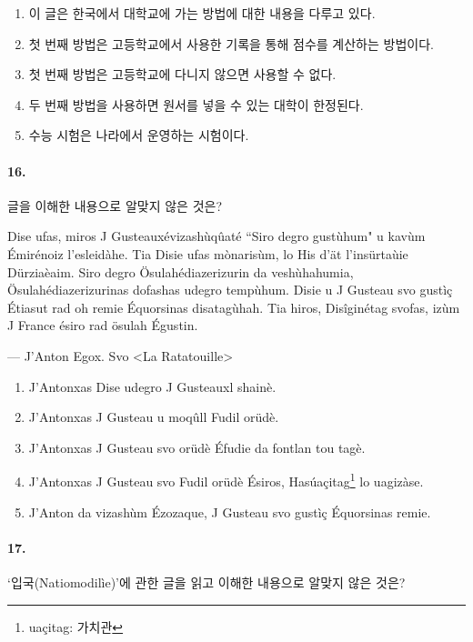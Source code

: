 \documentclass{article}
\begin{document}
\begin{enumerate}
    \item 이 글은 한국에서 대학교에 가는 방법에 대한 내용을 다루고 있다.
    \item 첫 번째 방법은 고등학교에서 사용한 기록을 통해 점수를 계산하는 방법이다.
    \item 첫 번째 방법은 고등학교에 다니지 않으면 사용할 수 없다.
    \item 두 번째 방법을 사용하면 원서를 넣을 수 있는 대학이 한정된다.
    \item 수능 시험은 나라에서 운영하는 시험이다.
\end{enumerate}

\paragraph{16.}
글을 이해한 내용으로 알맞지 않은 것은?

\begin{reminder}
    Dise ufas, miros J Gusteauxévizashùqûaté ``Siro degro gustùhum" u kavùm Émirénoiz l'esleidàhe.
    Tia Disie ufas mònarisùm, lo His d'ät l'insürtaùie Dürziaèaim.
    Siro degro Ösulahédiazerizurin da veshùhahumia, Ösulahédiazerizurinas dofashas udegro tempùhum.
    Disie u J Gusteau svo gustìç Étiasut rad oh remie Équorsinas disatagùhah.
    Tia hiros, Disîginétag svofas, izùm J France ésiro rad ösulah Égustin.

    --- J'Anton Egox. Svo <La Ratatouille>
\end{reminder}

\begin{enumerate}
    \item J'Antonxas Dise udegro J Gusteauxl shainè.
    \item J'Antonxas J Gusteau u moqûll Fudil orüdè.
    \item J'Antonxas J Gusteau svo orüdè Éfudie da fontlan tou tagè.
    \item J'Antonxas J Gusteau svo Fudil orüdè Ésiros, Hasúaçitag\footnote{uaçitag: 가치관} lo uagizàse.
    \item J'Anton da vizashùm Ézozaque, J Gusteau svo gustìç Équorsinas remie.
\end{enumerate}

\pagebreak

\paragraph{17.}
`입국(Natiomodilìe)'에 관한 글을 읽고 이해한 내용으로 알맞지 않은 것은?
\end{document}
